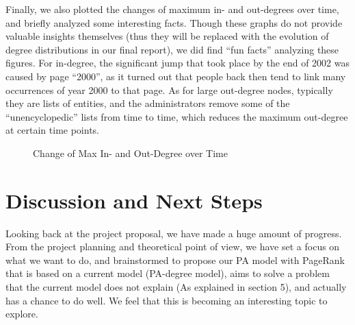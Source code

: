 \documentclass[10pt]{article}
\begin{document}
\begin{multicols}{2}
Finally, we also plotted the changes of maximum in- and out-degrees over time, and briefly analyzed some interesting facts. Though these graphs do not provide valuable insights themselves (thus they will be replaced with the evolution of degree distributions in our final report), we did find ``fun facts'' analyzing these figures. For in-degree, the significant jump that took place by the end of 2002 was caused by page ``2000'', as it turned out that people back then tend to link many occurrences of year 2000 to that page. As for large out-degree nodes, typically they are lists of entities, and the administrators remove some of the ``unencyclopedic'' lists from time to time, which reduces the maximum out-degree at certain time points. 

\begin{figure}[H]
\caption{Change of Max In- and Out-Degree over Time \label{fig:max-degree}}
\end{figure}



\section{Discussion and Next Steps} 
\vspace{10pt}
Looking back at the project proposal, we have made a huge amount of progress. From the project planning and theoretical point of view, we have set a focus on what we want to do, and brainstormed to propose our PA model with PageRank that is based on a current model (PA-degree model), aims to solve a problem that the current model does not explain (As explained in section 5), and actually has a chance to do well. We feel that this is becoming an interesting topic to explore.


\end{multicols}
\end{document}
